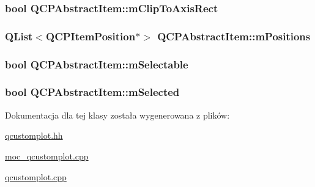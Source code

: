 \subsubsection[{\texorpdfstring{m\+Clip\+To\+Axis\+Rect}{mClipToAxisRect}}]{\setlength{\rightskip}{0pt plus 5cm}bool Q\+C\+P\+Abstract\+Item\+::m\+Clip\+To\+Axis\+Rect\hspace{0.3cm}{\ttfamily [protected]}}\hypertarget{class_q_c_p_abstract_item_ad2a70ff6b658fcb84a9427f69d3f587d}{}\label{class_q_c_p_abstract_item_ad2a70ff6b658fcb84a9427f69d3f587d}
\subsubsection[{\texorpdfstring{m\+Positions}{mPositions}}]{\setlength{\rightskip}{0pt plus 5cm}Q\+List$<${\bf Q\+C\+P\+Item\+Position}$\ast$$>$ Q\+C\+P\+Abstract\+Item\+::m\+Positions\hspace{0.3cm}{\ttfamily [protected]}}\hypertarget{class_q_c_p_abstract_item_af94ff71b6a15ea6d028ab8bd8eccd012}{}\label{class_q_c_p_abstract_item_af94ff71b6a15ea6d028ab8bd8eccd012}
\subsubsection[{\texorpdfstring{m\+Selectable}{mSelectable}}]{\setlength{\rightskip}{0pt plus 5cm}bool Q\+C\+P\+Abstract\+Item\+::m\+Selectable\hspace{0.3cm}{\ttfamily [protected]}}\hypertarget{class_q_c_p_abstract_item_ad81eb35c8726a0f458db9df9732e0e41}{}\label{class_q_c_p_abstract_item_ad81eb35c8726a0f458db9df9732e0e41}
\subsubsection[{\texorpdfstring{m\+Selected}{mSelected}}]{\setlength{\rightskip}{0pt plus 5cm}bool Q\+C\+P\+Abstract\+Item\+::m\+Selected\hspace{0.3cm}{\ttfamily [protected]}}\hypertarget{class_q_c_p_abstract_item_a4bdb3457dad1d268c0f78a44152b9645}{}\label{class_q_c_p_abstract_item_a4bdb3457dad1d268c0f78a44152b9645}


Dokumentacja dla tej klasy została wygenerowana z plików\+:\begin{DoxyCompactItemize}
\item 
\hyperlink{qcustomplot_8hh}{qcustomplot.\+hh}\item 
\hyperlink{moc__qcustomplot_8cpp}{moc\+\_\+qcustomplot.\+cpp}\item 
\hyperlink{qcustomplot_8cpp}{qcustomplot.\+cpp}\end{DoxyCompactItemize}
